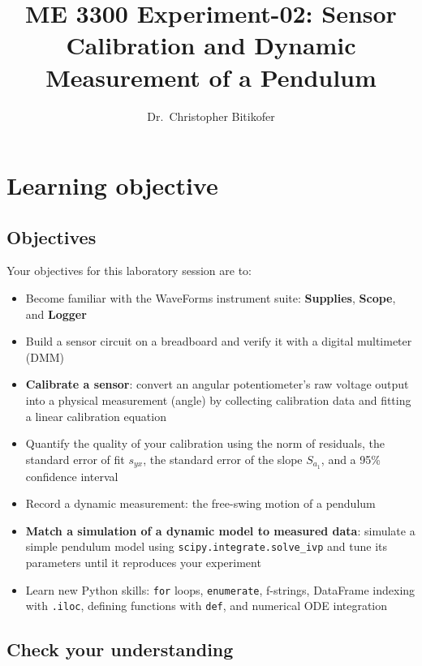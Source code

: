 \documentclass[
  12pt,
  letterpaper,
]{article}
\title{ME 3300 Experiment-02: Sensor Calibration and Dynamic Measurement
of a Pendulum}
\author{Dr.~Christopher Bitikofer}
\date{}
\providecommand{\tightlist}{%
  \setlength{\itemsep}{0pt}\setlength{\parskip}{0pt}}
\renewcommand*\contentsname{Table of contents}
\newcommand\contentsname{Table of contents}
\begin{document}
\maketitle

\renewcommand*\contentsname{Table of contents}
{
\setcounter{tocdepth}{3}
\tableofcontents
}

\newpage{}

\section{Learning objective}\label{learning-objective}

\subsection{Objectives}\label{objectives}

Your objectives for this laboratory session are to:

\begin{itemize}
\tightlist
\item
  Become familiar with the WaveForms instrument suite:
  \textbf{Supplies}, \textbf{Scope}, and \textbf{Logger}
\item
  Build a sensor circuit on a breadboard and verify it with a digital
  multimeter (DMM)
\item
  \textbf{Calibrate a sensor}: convert an angular potentiometer's raw
  voltage output into a physical measurement (angle) by collecting
  calibration data and fitting a linear calibration equation
\item
  Quantify the quality of your calibration using the norm of residuals,
  the standard error of fit \(s_{yx}\), the standard error of the slope
  \(S_{a_1}\), and a 95\% confidence interval
\item
  Record a dynamic measurement: the free-swing motion of a pendulum
\item
  \textbf{Match a simulation of a dynamic model to measured data}:
  simulate a simple pendulum model using
  \texttt{scipy.integrate.solve\_ivp} and tune its parameters until it
  reproduces your experiment
\item
  Learn new Python skills: \texttt{for} loops, \texttt{enumerate},
  f-strings, DataFrame indexing with \texttt{.iloc}, defining functions
  with \texttt{def}, and numerical ODE integration
\end{itemize}

\subsection{Check your understanding}\label{check-your-understanding}
\end{document}

